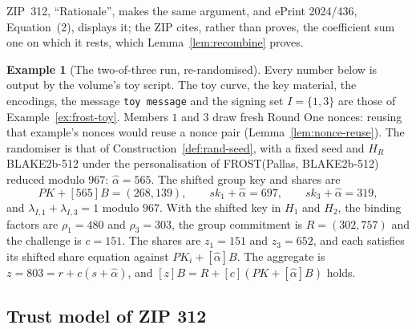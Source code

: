 \documentclass[11pt,a4paper]{article}
\theoremstyle{definition}
\newtheorem{example}[theorem]{Example}
\begin{document}
ZIP~312, ``Rationale'', makes the same argument, and ePrint 2024/436,
Equation~(2), displays it; the ZIP cites, rather than proves, the
coefficient sum one on which it rests, which Lemma~\ref{lem:recombine}
proves.

\begin{example}[The two-of-three run, re-randomised]\label{ex:rr-toy}
Every number below is output by the volume's toy script. The toy curve, the
key material, the encodings, the message \texttt{toy message} and the
signing set \(I = \{1, 3\}\) are those of Example~\ref{ex:frost-toy}.
Members \(1\) and \(3\) draw fresh Round One nonces: reusing that example's
nonces would reuse a nonce pair (Lemma~\ref{lem:nonce-reuse}). The
randomiser is that of Construction~\ref{def:rand-seed}, with a fixed seed
and \(H_R\) BLAKE2b-512 under the personalisation of
FROST(Pallas, BLAKE2b-512) reduced modulo \(967\):
\(\hat{\alpha} = 565\). The shifted group key and shares are
\[
  \mathit{PK} + [565]B = (268, 139) , \qquad
  \mathit{sk}_1 + \hat{\alpha} = 697 , \qquad
  \mathit{sk}_3 + \hat{\alpha} = 319 ,
\]
and \(\lambda_{I,1} + \lambda_{I,3} = 1\) modulo \(967\). With the shifted
key in \(H_1\) and \(H_2\), the binding factors are \(\rho_1 = 480\) and
\(\rho_3 = 303\), the group commitment is \(R = (302, 757)\) and the
challenge is \(c = 151\). The shares are \(z_1 = 151\) and \(z_3 = 652\),
and each satisfies its shifted share equation against
\(\mathit{PK}_i + [\hat{\alpha}]B\). The aggregate is
\(z = 803 = r + c(s + \hat{\alpha})\), and
\([z]B = R + [c](\mathit{PK} + [\hat{\alpha}]B)\) holds.
\end{example}

\subsection{Trust model of ZIP 312}\label{sec:rr-trust}
\end{document}
